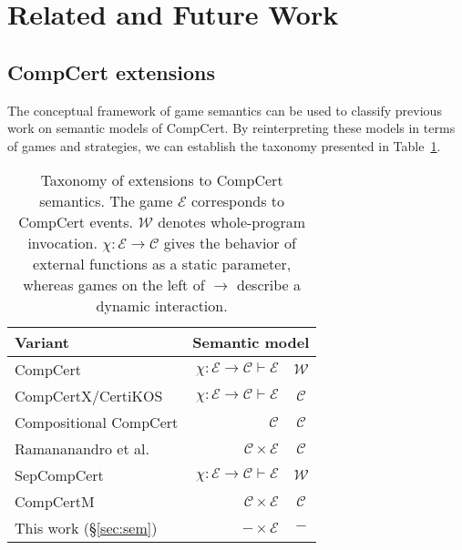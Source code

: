 \documentclass[sigplan,10pt,review,anonymous]{acmart}
\begin{document}


\section{Related and Future Work} %

\subsection{CompCert extensions} %

The conceptual framework of game semantics
can be used to classify previous work
on semantic models of CompCert.
By reinterpreting these models
in terms of games and strategies,
we can establish the taxonomy presented in
Table~\ref{tbl:compcerts}.

\begin{table} %
  \begin{tabular}{lr@{${}\rightarrow{}$}c}
    \hline
    Variant & \multicolumn{2}{r}{Semantic model} \\
    \hline
    CompCert \cite{compcert} &
      $\chi : \mathcal{E} \rightarrow \mathcal{C} \vdash \mathcal{E}$ &
      $\mathcal{W}$ \\
    CompCertX/CertiKOS \cite{popl15} &
      $\chi : \mathcal{E} \rightarrow \mathcal{C} \vdash \mathcal{E}$ &
      $\mathcal{C}$ \\
    Compositional CompCert \cite{compcompcert} &
      $\mathcal{C}$ & $\mathcal{C}$ \\
    Ramananandro et al. \cite{cpp15} &
      $\mathcal{C} \times \mathcal{E}$ & $\mathcal{C}$ \\
    SepCompCert \cite{sepcompcert} &
      $\chi : \mathcal{E} \rightarrow \mathcal{C} \vdash \mathcal{E}$ &
      $\mathcal{W}$ \\
    CompCertM \cite{compcertm} &
      $\mathcal{C} \times \mathcal{E}$ & $\mathcal{C}$ \\
    This work (\S\ref{sec:sem}) &
      $- \times \mathcal{E}$ & $-$ \\
    \hline
  \end{tabular}
  \vspace{1ex}
  \caption{Taxonomy of extensions to CompCert semantics.
    The game $\mathcal{E}$ corresponds to CompCert events.
    $\mathcal{W}$ denotes whole-program invocation.
    $\chi : \mathcal{E} \rightarrow \mathcal{C}$
    gives the behavior of external functions
    as a static parameter,
    whereas games on the left of $\rightarrow$
    describe a dynamic interaction.
  }
  \label{tbl:compcerts}
\end{table}
\end{document}

